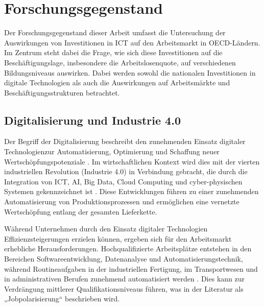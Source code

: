 
\section{Forschungsgegenstand}

Der Forschungsgegenstand dieser Arbeit umfasst die Untersuchung der Auswirkungen von 
Investitionen in \ac{ICT} auf den Arbeitsmarkt in \ac{OECD}-Ländern. Im Zentrum steht 
dabei die Frage, wie sich diese Investitionen auf die Beschäftigungslage, insbesondere 
die Arbeitslosenquote, auf verschiedenen Bildungsniveaus auswirken. Dabei werden sowohl 
die nationalen Investitionen in digitale Technologien als auch die Auswirkungen auf 
Arbeitsmärkte und Beschäftigungsstrukturen betrachtet.


\subsection{Digitalisierung und Industrie 4.0}

Der Begriff der Digitalisierung beschreibt den zunehmenden Einsatz digitaler 
Technologienzur Automatisierung, Optimierung und Schaffung neuer Wertschöpfungspotenziale
\parencite[vgl.][S. 6]{brennen2016theinternational}. Im wirtschaftlichen Kontext wird 
dies mit der vierten industriellen Revolution (Industrie 4.0) in Verbindung gebracht, 
die durch die Integration von \ac{ICT}, \ac{AI}, Big Data, Cloud Computing und 
cyber-physischen Systemen gekennzeichnet ist 
\parencite[vgl.][S. 13–14]{kagermann2013recommendations}. Diese Entwicklungen führen zu 
einer zunehmenden Automatisierung von Produktionsprozessen und ermöglichen eine 
vernetzte Wertschöpfung entlang der gesamten Lieferkette.

Während Unternehmen durch den Einsatz digitaler Technologien Effizienzsteigerungen 
erzielen können, ergeben sich für den Arbeitsmarkt erhebliche Herausforderungen. 
Hochqualifizierte Arbeitsplätze entstehen in den Bereichen Softwareentwicklung, 
Datenanalyse und Automatisierungstechnik, während Routineaufgaben in der industriellen 
Fertigung, im Transportwesen und in administrativen Berufen zunehmend automatisiert 
werden \parencite[vgl.][S. 36–37]{frey2013thefuture}. Dies kann zur Verdrängung mittlerer
Qualifikationsniveaus führen, was in der Literatur als „Jobpolarisierung“ beschrieben wird.

